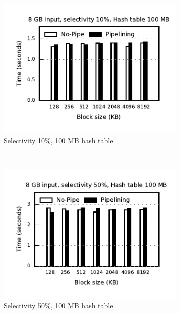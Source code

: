 \begin{figure}[t]
	\centering
	\begin{subfigure}[ht]{0.32\textwidth}
		\includegraphics[width=\textwidth]{pipeline/figures/microbenchmark-8gbinput-100mbht-selectivity10pc}	
		\caption{Selectivity 10\%, 100 MB hash table}
	\end{subfigure}
	~
	\begin{subfigure}[ht]{0.32\textwidth}
		\includegraphics[width=\textwidth]{pipeline/figures/microbenchmark-8gbinput-100mbht-selectivity50pc}	
		\caption{Selectivity 50\%, 100 MB hash table}		
	\end{subfigure}
	~
	\begin{subfigure}[ht]{0.32\textwidth}

\end{subfigure}
\end{figure}
